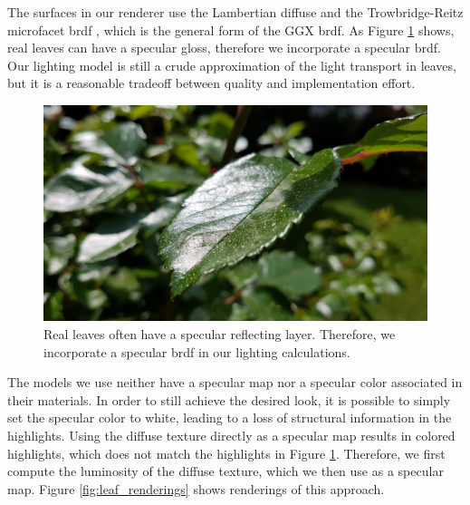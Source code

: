 The surfaces in our renderer use the Lambertian diffuse \cite{lambert} and the Trowbridge-Reitz microfacet \ac{brdf} \cite{trowbridge_reitz}, which is the general form of the GGX \ac{brdf}.
As Figure \ref{fig:leaf_gloss} shows, real leaves can have a specular gloss, therefore we incorporate a specular \ac{brdf}.
Our lighting model is still a crude approximation of the light transport in leaves, but it is a reasonable tradeoff between quality and implementation effort.
\begin{figure}[t]
    \centering
    \includegraphics[width=0.5\linewidth]{img/leaf_gloss.jpg}
    \caption[Leaf with glossy surface]{Real leaves often have a specular reflecting layer. Therefore, we incorporate a specular \ac{brdf} in our lighting calculations.}
    \label{fig:leaf_gloss}
\end{figure} 
The models we use neither have a specular map nor a specular color associated in their materials.
In order to still achieve the desired look, it is possible to simply set the specular color to white, leading to a loss of structural information in the highlights.
Using the diffuse texture directly as a specular map results in colored highlights, which does not match the highlights in Figure \ref{fig:leaf_gloss}.
Therefore, we first compute the luminosity of the diffuse texture, which we then use as a specular map.
Figure \ref{fig:leaf_renderings} shows renderings of this approach.
